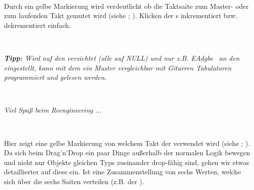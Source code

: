 \documentclass[10pt,final,a4paper]{report}
\begin{document}
~

Durch ein gelbe Markierung wird verdeutlicht ob die Taktsaite zum Master- oder zum laufenden Takt gemutet wird (siehe ; ).
%
%
%
Klicken der \plusminusbutton s inkrementiert bzw. dekrementiert  einfach.

~

\textit{\textbf{Tipp:} Wird auf den  verzichtet (alle  auf NULL) und nur z.B. \gin EAdgbe\gout~ an den  eingestellt, kann mit dem  ein Muster vergleichbar mit Gitarren Tabulatoren programmiert und gelesen werden.}

~

\textit{Viel Spaß beim Reengineering ...}

~

Hier zeigt eine gelbe Markierung von welchem Takt der  verwendet wird (siehe ; ).
%
%
%
Da sich beim Drag'n'Drop ein paar Dinge außerhalb der normalen Logik bewegen und nicht nur Objekte gleichen Typs zueinander \gin drop\gout-fähig sind, gehen wir etwas detaillierter auf diese ein.
%
%
%
Ist eine Zusammenstellung von sechs Werten, welche sich über die sechs Saiten verteilen (z.B. der ).
\end{document}
